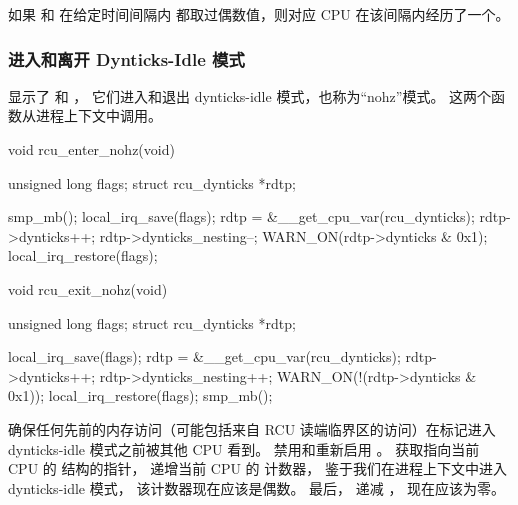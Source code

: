 如果  和  在给定时间间隔内
都取过偶数值，则对应 CPU 在该间隔内经历了一个。

\QuickQuizEnd

\subsubsection{进入和离开 Dynticks-Idle 模式}
\label{sec:formal:Entering and Leaving Dynticks-Idle Mode}

显示了  和 ，
它们进入和退出 dynticks-idle 模式，也称为``nohz''模式。
这两个函数从进程上下文中调用。

\begin{listing}
\begin{fcvlabel}
\begin{VerbatimL}[commandchars=\\\[\]]
void rcu_enter_nohz(void)
{
	unsigned long flags;
	struct rcu_dynticks *rdtp;

	smp_mb();			\lnlbl[mb]
	local_irq_save(flags);		\lnlbl[irq_sv]
	rdtp = &__get_cpu_var(rcu_dynticks); 
	rdtp->dynticks++;		
	rdtp->dynticks_nesting--;	
	WARN_ON(rdtp->dynticks & 0x1);
	local_irq_restore(flags);	\lnlbl[irq_rs]
}

void rcu_exit_nohz(void)
{
	unsigned long flags;
	struct rcu_dynticks *rdtp;

	local_irq_save(flags);
	rdtp = &__get_cpu_var(rcu_dynticks);
	rdtp->dynticks++;
	rdtp->dynticks_nesting++;
	WARN_ON(!(rdtp->dynticks & 0x1));
	local_irq_restore(flags);
	smp_mb();
}
\end{VerbatimL}
\end{fcvlabel}
\caption{进入和退出 Dynticks-Idle 模式}
\label{lst:formal:Entering and Exiting Dynticks-Idle Mode}
\end{listing}

\begin{fcvref}
 确保任何先前的内存访问（可能包括来自 RCU
读端临界区的访问）在标记进入 dynticks-idle 模式之前被其他 CPU 看到。
 禁用和重新启用 \IRQ。
 获取指向当前 CPU 的 
结构的指针，
 递增当前 CPU 的  计数器，
鉴于我们在进程上下文中进入 dynticks-idle 模式，
该计数器现在应该是偶数。
最后， 递减 ，
现在应该为零。
\end{fcvref}

